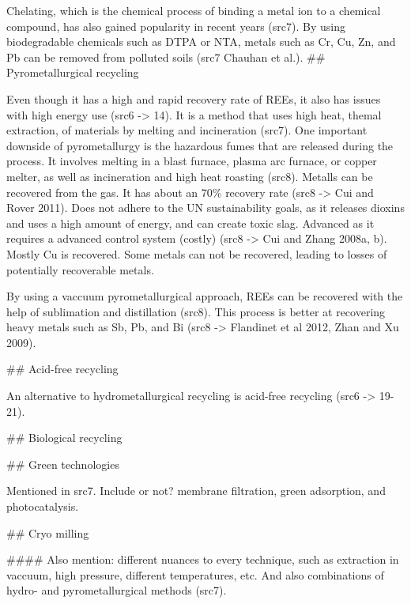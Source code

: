 Chelating, which is the chemical process of binding a metal ion to a chemical compound, has also gained popularity in recent years (src7). By using biodegradable chemicals such as DTPA or NTA, metals such as Cr, Cu, Zn, and Pb can be removed from polluted soils (src7 Chauhan et al.).
## Pyrometallurgical recycling

Even though it has a high and rapid recovery rate of REEs, it also has issues with high energy use (src6 -> 14). It is a method that uses high heat, themal extraction, of materials by melting and incineration (src7). One important downside of pyrometallurgy is the hazardous fumes that are released during the process. It involves melting in a blast furnace, plasma arc furnace, or copper melter, as well as incineration and high heat roasting (src8). Metalls can be recovered from the gas. It has about an 70\% recovery rate (src8 -> Cui and Rover 2011). Does not adhere to the UN sustainability goals, as it releases dioxins and uses a high amount of energy, and can create toxic slag. Advanced as it requires a advanced control system (costly) (src8 -> Cui and Zhang 2008a, b). Mostly Cu is recovered. Some metals can not be recovered, leading to losses of potentially recoverable metals.

By using a vaccuum pyrometallurgical approach, REEs can be recovered with the help of sublimation and distillation (src8). This process is better at recovering heavy metals such as Sb, Pb, and Bi (src8 -> Flandinet et al 2012, Zhan and Xu 2009).

## Acid-free recycling

An alternative to hydrometallurgical recycling is acid-free recycling (src6 -> 19-21).

## Biological recycling

## Green technologies

Mentioned in src7. Include or not? membrane filtration, green adsorption, and photocatalysis.

## Cryo milling


#### Also mention:
different nuances to every technique, such as extraction in vaccuum, high pressure, different temperatures, etc. And also combinations of hydro- and pyrometallurgical methods (src7).